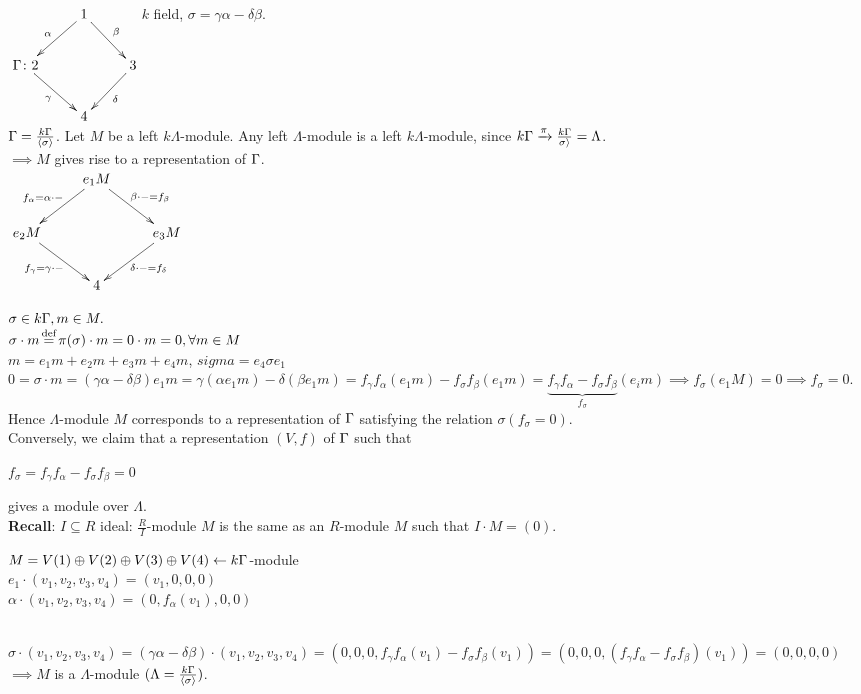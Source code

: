 \begin{exam}
	$\xymatrix{ & 1\ar[dl]_\alpha\ar[dr]^\beta & \\
		\G \colon 2\ar[dr]_\gamma & & 3\ar[dl]^\delta\\
		& 4 & }$\newline $k$ field, $\sigma = \gamma\alpha - \delta\beta$.\\\newline
		$ \Gamma=\frac{k\Gamma}{\langle\sigma\rangle}$. Let $M$ be a left $k\Lambda$-module. Any left $\Lambda$-module is a left $k\Lambda$-module, since $k\Gamma \xrightarrow{\pi} \frac{k\Gamma}{\large\sigma\rangle} = \Lambda$.\\
		$\implies M$ gives rise to a representation of $\Gamma$.\\
		
	$\xymatrix{ & e_1M\ar[dl]_{f_\alpha = \alpha\cdot-}\ar[dr]^{\beta\cdot-=f_\beta} & \\
	 e_2M\ar[dr]_{f_\gamma=\gamma\cdot-} & & e_3M\ar[dl]^{\delta\cdot-=f_\delta}\\
	& 4 & }$\newline

$\sigma\in k\Gamma, m \in M.$\\ $ \sigma\cdot m\defeq\pi(\sigma)\cdot m = 0\cdot m = 0, \forall m \in M$\\
$m=e_1m+e_2m+e_3m+e_4m$, $sigma = e_4\sigma e_1$\\
$0 = \sigma\cdot m = (\gamma\alpha-\delta\beta)e_1m = \gamma(\alpha e_1m)-\delta(\beta e_1m) = f_\gamma f_\alpha(e_1m)-f_\sigma f_\beta(e_1m) = \underbrace{f_\gamma f_\alpha-f_\sigma f_\beta}_{f_\sigma}(e_im) \implies f_\sigma(e_1M)=0 \implies f_\sigma = 0 $.\\
Hence $\Lambda$-module $M$ corresponds to a representation of $\Gamma$ satisfying the relation $\sigma(f_\sigma=0)$.\\
Conversely, we claim that a representation $(V,f)$ of $\Gamma$ 	such that
\begin{center}
	$f_\sigma=f_\gamma f_\alpha-f_\sigma f_\beta=0$
\end{center} 
 gives a module over $\Lambda$.\\\newline
\textbf{Recall}: $I \subseteq R$ ideal: $\frac{R}{I}$-module $M$ is the same as an $R$-module $M$ such that $I\cdot M = (0)$.\\
\begin{center}
	$M = V(1) \oplus V(2) \oplus V(3) \oplus V(4) \leftarrow k\Gamma$-module\\
	$e_1\cdot(v_1,v_2,v_3,v_4)=(v_1,0,0,0)$\\
	$\alpha\cdot(v_1,v_2,v_3,v_4)=(0,f_\alpha(v_1),0,0)$\\
\end{center}
~\\$\sigma\cdot(v_1,v_2,v_3,v_4) = (\gamma\alpha-\delta\beta)\cdot(v_1,v_2,v_3,v_4) = (0,0,0,f_\gamma f_\alpha(v_1)-f_\sigma f_\beta(v_1)) =  (0,0,0,(f_\gamma f_\alpha-f_\sigma f_\beta)(v_1)) = (0,0,0,0) $\\\newline
$\implies M$ is a $\Lambda$-module $(\Lambda=\frac{k\Gamma}{\langle\sigma\rangle})$.
\end{exam}

